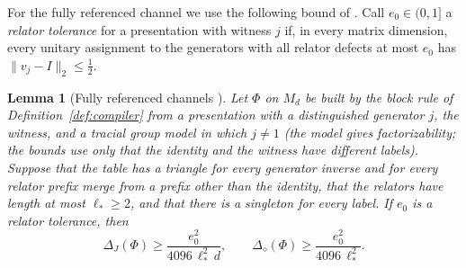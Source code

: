 \documentclass[11pt]{article}
\newtheorem{lemma}[theorem]{Lemma}
\begin{document}
For the fully referenced channel we use the following bound of \cite{MghirbiDouglasV1}.  Call $e_0\in(0,1]$ a \emph{relator tolerance} for a presentation with witness $j$ if, in every matrix dimension, every unitary assignment to the generators with all relator defects at most $e_0$ has $\|v_j-I\|_2\le\tfrac12$.

\begin{lemma}[Fully referenced channels {\cite[Theorem~6]{MghirbiDouglasV1}}]\label{lem:fullref}
Let $\Phi$ on $M_d$ be built by the block rule of Definition~\ref{def:compiler} from a presentation with a distinguished generator $j$, the witness, and a tracial group model in which $j\ne1$ (the model gives factorizability; the bounds use only that the identity and the witness have different labels).  Suppose that the table has a triangle for every generator inverse and for every relator prefix merge from a prefix other than the identity, that the relators have length at most $\ell_*\ge2$, and that there is a singleton for every label.  If $e_0$ is a relator tolerance, then
\[
 \Delta_J(\Phi)\ge\frac{e_0^2}{4096\,\ell_*^2\,d},\qquad \Delta_\diamond(\Phi)\ge\frac{e_0^2}{4096\,\ell_*^2}.
\]
\end{lemma}
\end{document}
